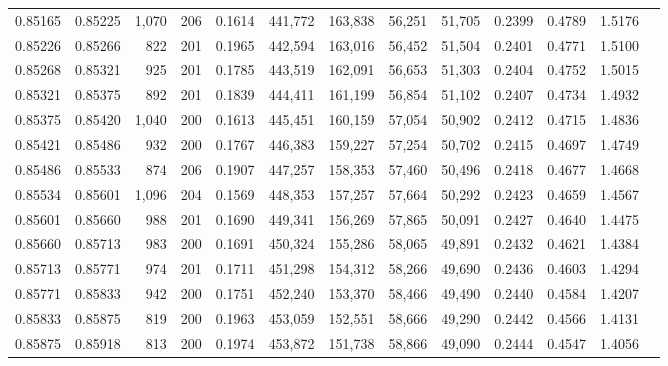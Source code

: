 \begin{tabular}{rrrrrrrrrrrrr}
0.85165 & 0.85225 & 1,070 & 206 &                                     0.1614 & 441,772 & 163,838 &  56,251 &  51,705 & 0.2399 & 0.4789 & 1.5176 \\
0.85226 & 0.85266 &   822 & 201 &                                     0.1965 & 442,594 & 163,016 &  56,452 &  51,504 & 0.2401 & 0.4771 & 1.5100 \\
0.85268 & 0.85321 &   925 & 201 &                                     0.1785 & 443,519 & 162,091 &  56,653 &  51,303 & 0.2404 & 0.4752 & 1.5015 \\
0.85321 & 0.85375 &   892 & 201 &                                     0.1839 & 444,411 & 161,199 &  56,854 &  51,102 & 0.2407 & 0.4734 & 1.4932 \\
0.85375 & 0.85420 & 1,040 & 200 &                                     0.1613 & 445,451 & 160,159 &  57,054 &  50,902 & 0.2412 & 0.4715 & 1.4836 \\
0.85421 & 0.85486 &   932 & 200 &                                     0.1767 & 446,383 & 159,227 &  57,254 &  50,702 & 0.2415 & 0.4697 & 1.4749 \\
0.85486 & 0.85533 &   874 & 206 &                                     0.1907 & 447,257 & 158,353 &  57,460 &  50,496 & 0.2418 & 0.4677 & 1.4668 \\
0.85534 & 0.85601 & 1,096 & 204 &                                     0.1569 & 448,353 & 157,257 &  57,664 &  50,292 & 0.2423 & 0.4659 & 1.4567 \\
0.85601 & 0.85660 &   988 & 201 &                                     0.1690 & 449,341 & 156,269 &  57,865 &  50,091 & 0.2427 & 0.4640 & 1.4475 \\
0.85660 & 0.85713 &   983 & 200 &                                     0.1691 & 450,324 & 155,286 &  58,065 &  49,891 & 0.2432 & 0.4621 & 1.4384 \\
0.85713 & 0.85771 &   974 & 201 &                                     0.1711 & 451,298 & 154,312 &  58,266 &  49,690 & 0.2436 & 0.4603 & 1.4294 \\
0.85771 & 0.85833 &   942 & 200 &                                     0.1751 & 452,240 & 153,370 &  58,466 &  49,490 & 0.2440 & 0.4584 & 1.4207 \\
0.85833 & 0.85875 &   819 & 200 &                                     0.1963 & 453,059 & 152,551 &  58,666 &  49,290 & 0.2442 & 0.4566 & 1.4131 \\
0.85875 & 0.85918 &   813 & 200 &                                     0.1974 & 453,872 & 151,738 &  58,866 &  49,090 & 0.2444 & 0.4547 & 1.4056 \\

\end{tabular}
